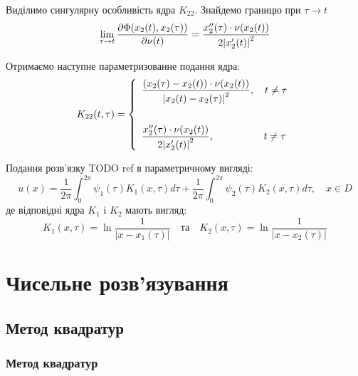 \documentclass{beamer}
\numberwithin{equation}{section}
\begin{document}
	
	\begin{frame}
		Виділимо сингулярну особливість ядра $K_{22}$. Знайдемо границю при $\tau \rightarrow t$
		$$
		\lim_{\tau \rightarrow t } \pdv{\Phi(x_{2}(t), x_{2}(\tau))}{\nu(t)} =
		\frac{  x''_{2}(\tau) \cdot \nu (x_2(t)) }{ 2\abs{ x'_{2}(t)}^2 } 
		$$
		
		Отримаємо наступне параметризованне подання ядра:
		$$
		K_{22}(t, \tau) = 
		\left\{
		\begin{array}{l}
			\displaystyle
			\frac{ \left( x_{2}(\tau) - x_{2}(t) \right) \cdot \nu (x_2(t)) }{ \abs{ x_{2}(t)-x_{2}(\tau) }^2 } 
			,\quad t \neq \tau
			\\ [1cm]
			
			\displaystyle
			\frac{  x''_{2}(\tau) \cdot \nu (x_2(t)) }{ 2\abs{ x'_{2}(t)}^2 } 
			,\quad \quad  \quad  \quad  \quad  t \neq \tau
		\end{array}
		\right.
		$$
	\end{frame}


	\begin{frame}
		 Подання розв'язку TODO ref в параметричному вигляді:
		$$
		u(x)=\frac{1}{2 \pi} \int_{0}^{2 \pi} \psi_{1}(\tau) K_{1}(x, \tau) d \tau+\frac{1}{2 \pi} \int_{0}^{2 \pi} \psi_{2}(\tau) K_{2}(x, \tau) d \tau, \quad x \in D
		$$
		де відповідні ядра $K_{1}$ і $K_{2}$ мають вигляд:
		$$
		K_{1}(x, \tau)=\ln \frac{1}{\left|x-x_{1}(\tau)\right|}
		\quad \text{та} \quad 
		K_{2}(x, \tau)=\ln \frac{1}{\left|x-x_{2}(\tau)\right|}
		$$
		
		
	\end{frame}

	\section{Чисельне розв'язування} 

	\subsection{Метод квадратур}
	\begin{frame}
			\frametitle{Метод квадратур}
	\end{frame}
		
	
\end{document}
